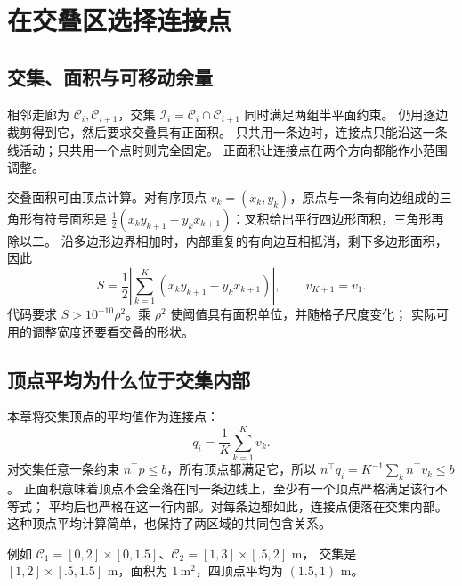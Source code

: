 \section{在交叠区选择连接点}
\subsection{交集、面积与可移动余量}
相邻走廊为 $\mathcal C_i,\mathcal C_{i+1}$，交集
$\mathcal I_i=\mathcal C_i\cap\mathcal C_{i+1}$ 同时满足两组半平面约束。
仍用逐边裁剪得到它，然后要求交叠具有正面积。
只共用一条边时，连接点只能沿这一条线活动；只共用一个点时则完全固定。
正面积让连接点在两个方向都能作小范围调整。

交叠面积可由顶点计算。对有序顶点 $v_k=(x_k,y_k)$，原点与一条有向边组成的三角形有符号面积是
$\tfrac12(x_k y_{k+1}-y_k x_{k+1})$：叉积给出平行四边形面积，三角形再除以二。
沿多边形边界相加时，内部重复的有向边互相抵消，剩下多边形面积，因此
\begin{equation}
S=\frac12\left|\sum_{k=1}^{K}(x_k y_{k+1}-y_k x_{k+1})\right|,
\qquad v_{K+1}=v_1.
\end{equation}
代码要求 $S>10^{-10}\rho^2$。乘 $\rho^2$ 使阈值具有面积单位，并随格子尺度变化；
实际可用的调整宽度还要看交叠的形状。

\subsection{顶点平均为什么位于交集内部}
本章将交集顶点的平均值作为连接点：
\begin{equation}q_i=\frac1K\sum_{k=1}^K v_k.\end{equation}
对交集任意一条约束 $n^\top p\leq b$，所有顶点都满足它，所以
$n^\top q_i=K^{-1}\sum_k n^\top v_k\leq b$。
正面积意味着顶点不会全落在同一条边线上，至少有一个顶点严格满足该行不等式；
平均后也严格在这一行内部。对每条边都如此，连接点便落在交集内部。
这种顶点平均计算简单，也保持了两区域的共同包含关系。

例如 $\mathcal C_1=[0,2]\times[0,1.5]$、$\mathcal C_2=[1,3]\times[.5,2]$ m，
交集是 $[1,2]\times[.5,1.5]$ m，面积为 $1\,\text{m}^2$，四顶点平均为 $(1.5,1)$ m。

\begin{center}
\end{center}

